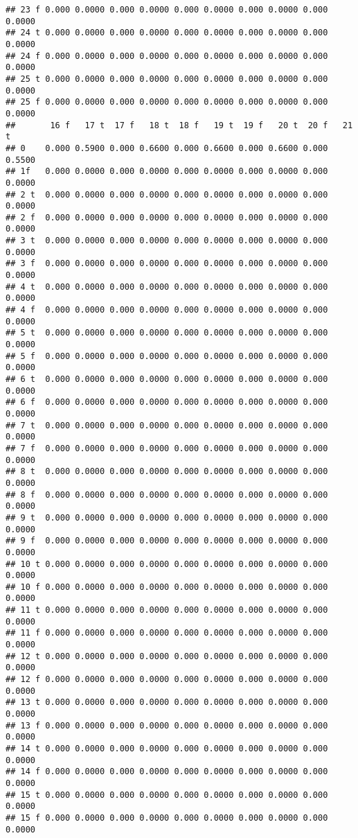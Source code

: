 \documentclass[]{article}
\begin{document}
\begin{verbatim}
## 23 f 0.000 0.0000 0.000 0.0000 0.000 0.0000 0.000 0.0000 0.000 0.0000
## 24 t 0.000 0.0000 0.000 0.0000 0.000 0.0000 0.000 0.0000 0.000 0.0000
## 24 f 0.000 0.0000 0.000 0.0000 0.000 0.0000 0.000 0.0000 0.000 0.0000
## 25 t 0.000 0.0000 0.000 0.0000 0.000 0.0000 0.000 0.0000 0.000 0.0000
## 25 f 0.000 0.0000 0.000 0.0000 0.000 0.0000 0.000 0.0000 0.000 0.0000
##       16 f   17 t  17 f   18 t  18 f   19 t  19 f   20 t  20 f   21 t
## 0    0.000 0.5900 0.000 0.6600 0.000 0.6600 0.000 0.6600 0.000 0.5500
## 1f   0.000 0.0000 0.000 0.0000 0.000 0.0000 0.000 0.0000 0.000 0.0000
## 2 t  0.000 0.0000 0.000 0.0000 0.000 0.0000 0.000 0.0000 0.000 0.0000
## 2 f  0.000 0.0000 0.000 0.0000 0.000 0.0000 0.000 0.0000 0.000 0.0000
## 3 t  0.000 0.0000 0.000 0.0000 0.000 0.0000 0.000 0.0000 0.000 0.0000
## 3 f  0.000 0.0000 0.000 0.0000 0.000 0.0000 0.000 0.0000 0.000 0.0000
## 4 t  0.000 0.0000 0.000 0.0000 0.000 0.0000 0.000 0.0000 0.000 0.0000
## 4 f  0.000 0.0000 0.000 0.0000 0.000 0.0000 0.000 0.0000 0.000 0.0000
## 5 t  0.000 0.0000 0.000 0.0000 0.000 0.0000 0.000 0.0000 0.000 0.0000
## 5 f  0.000 0.0000 0.000 0.0000 0.000 0.0000 0.000 0.0000 0.000 0.0000
## 6 t  0.000 0.0000 0.000 0.0000 0.000 0.0000 0.000 0.0000 0.000 0.0000
## 6 f  0.000 0.0000 0.000 0.0000 0.000 0.0000 0.000 0.0000 0.000 0.0000
## 7 t  0.000 0.0000 0.000 0.0000 0.000 0.0000 0.000 0.0000 0.000 0.0000
## 7 f  0.000 0.0000 0.000 0.0000 0.000 0.0000 0.000 0.0000 0.000 0.0000
## 8 t  0.000 0.0000 0.000 0.0000 0.000 0.0000 0.000 0.0000 0.000 0.0000
## 8 f  0.000 0.0000 0.000 0.0000 0.000 0.0000 0.000 0.0000 0.000 0.0000
## 9 t  0.000 0.0000 0.000 0.0000 0.000 0.0000 0.000 0.0000 0.000 0.0000
## 9 f  0.000 0.0000 0.000 0.0000 0.000 0.0000 0.000 0.0000 0.000 0.0000
## 10 t 0.000 0.0000 0.000 0.0000 0.000 0.0000 0.000 0.0000 0.000 0.0000
## 10 f 0.000 0.0000 0.000 0.0000 0.000 0.0000 0.000 0.0000 0.000 0.0000
## 11 t 0.000 0.0000 0.000 0.0000 0.000 0.0000 0.000 0.0000 0.000 0.0000
## 11 f 0.000 0.0000 0.000 0.0000 0.000 0.0000 0.000 0.0000 0.000 0.0000
## 12 t 0.000 0.0000 0.000 0.0000 0.000 0.0000 0.000 0.0000 0.000 0.0000
## 12 f 0.000 0.0000 0.000 0.0000 0.000 0.0000 0.000 0.0000 0.000 0.0000
## 13 t 0.000 0.0000 0.000 0.0000 0.000 0.0000 0.000 0.0000 0.000 0.0000
## 13 f 0.000 0.0000 0.000 0.0000 0.000 0.0000 0.000 0.0000 0.000 0.0000
## 14 t 0.000 0.0000 0.000 0.0000 0.000 0.0000 0.000 0.0000 0.000 0.0000
## 14 f 0.000 0.0000 0.000 0.0000 0.000 0.0000 0.000 0.0000 0.000 0.0000
## 15 t 0.000 0.0000 0.000 0.0000 0.000 0.0000 0.000 0.0000 0.000 0.0000
## 15 f 0.000 0.0000 0.000 0.0000 0.000 0.0000 0.000 0.0000 0.000 0.0000

\end{verbatim}
\end{document}

